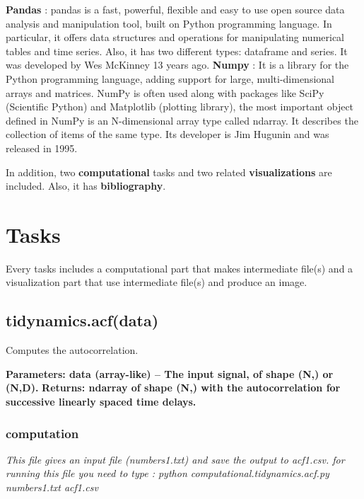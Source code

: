 \documentclass[12pt, a4paper, twoside]{report}
\begin{document}
\begin{itemize}
\textbf{Pandas} : pandas is a fast, powerful, flexible and easy to use open source data analysis and manipulation tool, built on Python programming language. In particular, it offers data structures and operations for manipulating numerical tables and time series. Also, it has two different types: dataframe and series. It was developed by Wes McKinney 13 years ago.\newline
\textbf{Numpy} : It is a library for the Python programming language, adding support for large, multi-dimensional arrays and matrices. NumPy is often used along with packages like SciPy (Scientific Python) and Matplotlib (plotting library), the most important object defined in NumPy is an N-dimensional array type called ndarray. It describes the collection of items of the same type. Its developer is Jim Hugunin and was released in 1995.\newpage

\end{itemize}
In addition, two \textbf{computational} tasks and two related \textbf{visualizations} are included. Also, it has \textbf{bibliography}.

\newpage
\section{Tasks}

Every tasks includes a computational part that makes intermediate file(s) and a visualization part that use intermediate file(s) and produce an image.  

\subsection{tidynamics.acf(data)}
Computes the autocorrelation.


\textbf{ Parameters:	data (array-like) – The input signal, of shape (N,) or (N,D).}\newline
\textbf{ Returns:	ndarray of shape (N,) with the autocorrelation for successive linearly spaced time delays.}
 
\subsubsection{computation}
 
\textit{This file gives an input file (numbers1.txt) and save the output to acf1.csv.\newline
for running this file you need to type : python computational.tidynamics.acf.py numbers1.txt acf1.csv\newline}
\end{document}
